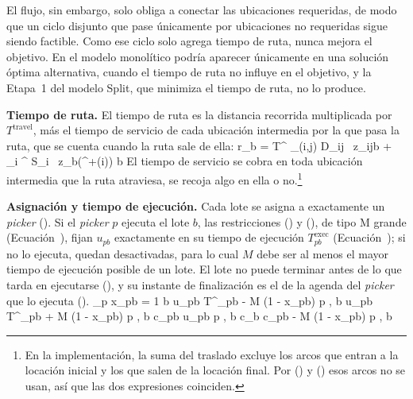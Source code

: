 El flujo, sin embargo, solo obliga a conectar las ubicaciones requeridas, de
modo que un ciclo disjunto que pase únicamente por ubicaciones no requeridas
sigue siendo factible. Como ese ciclo solo agrega tiempo de ruta, nunca mejora el objetivo.
En el modelo monolítico podría aparecer únicamente en una solución óptima
alternativa, cuando el tiempo de ruta no influye en el objetivo, y la Etapa~1
del modelo Split, que minimiza el tiempo de ruta, no lo produce.

{\bf Tiempo de ruta.}
El tiempo de ruta es la distancia recorrida multiplicada por
$T^{\text{travel}}$, más el tiempo de servicio de cada ubicación intermedia
por la que pasa la ruta, que se cuenta cuando la ruta sale de ella:
\startplaceformula[reference=eq:mono_ruta]
\startformula
	r_b = T^{} \sum_{(i,j) \in {}} D_{ij} \, z_{ijb}
	\;+\; \sum_{i \in {}^{}} S_i \, z_b(\delta^{+}(i))
	\qquad \forall b \in {}
\stopformula
\stopplaceformula
El tiempo de servicio se cobra en toda ubicación intermedia que la ruta
atraviesa, se recoja algo en ella o no.\footnote{En la implementación, la
suma del traslado excluye los arcos que entran a la locación inicial y los
que salen de la locación final. Por () y () esos arcos
no se usan, así que las dos expresiones coinciden.}

\stopsubsection

\startsubsection[title={Asignación, secuencia y fechas de entrega}, reference=sec:mono_asignacion]

{\bf Asignación y tiempo de ejecución.} Cada lote se asigna a exactamente un
{\em picker} (). Si el {\em picker} $p$ ejecuta el
lote $b$, las restricciones () y (), de
tipo M grande (Ecuación~\in[eq:bigm]), fijan $u_{pb}$ exactamente en su
tiempo de ejecución $T^{\text{exec}}_{pb}$ (Ecuación~\in[eq:texec]); si no lo
ejecuta, quedan desactivadas, para lo cual $M$ debe ser al menos el mayor
tiempo de ejecución posible de un lote. El lote
no puede terminar antes de lo que tarda en ejecutarse (), y
su instante de finalización es el de la agenda del {\em picker} que lo
ejecuta (\in[eq:mono_cb]).
\startplaceformula
\startformula
	\startalign[n=3, align={right,left,left}]
		\NC \NC \sum_{p \in {}} x_{pb} = 1 \NC \qquad \forall b \in {} 
		\NC \NC u_{pb} \geq T^{}_{pb} - M (1 - x_{pb}) \NC \qquad \forall p \in {},\; b \in {} 
		\NC \NC u_{pb} \leq T^{}_{pb} + M (1 - x_{pb}) \NC \qquad \forall p \in {},\; b \in {} 
		\NC \NC c_{pb} \geq u_{pb} \NC \qquad \forall p \in {},\; b \in {} 
		\NC \NC c_b \geq c_{pb} - M (1 - x_{pb}) \NC \qquad \forall p \in {},\; b \in {} \NR[eq:mono_cb]
	\stopalign
\stopformula
\stopplaceformula

